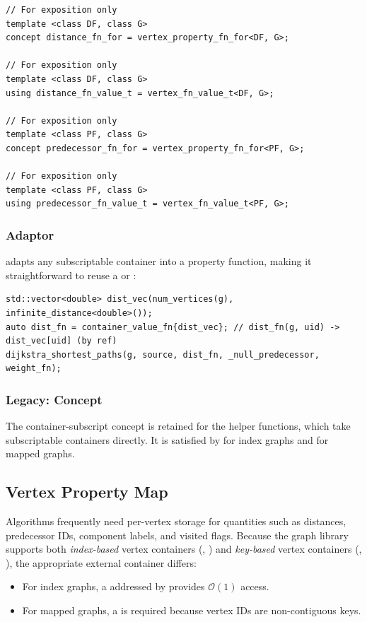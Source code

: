 \begin{lstlisting}
// For exposition only
template <class DF, class G>
concept distance_fn_for = vertex_property_fn_for<DF, G>;

// For exposition only
template <class DF, class G>
using distance_fn_value_t = vertex_fn_value_t<DF, G>;

// For exposition only
template <class PF, class G>
concept predecessor_fn_for = vertex_property_fn_for<PF, G>;

// For exposition only
template <class PF, class G>
using predecessor_fn_value_t = vertex_fn_value_t<PF, G>;
\end{lstlisting}

\subsubsection{ Adaptor}
 adapts any subscriptable container into a property
function, making it straightforward to reuse a  or
:
\begin{lstlisting}[texcl=false]
std::vector<double> dist_vec(num_vertices(g), infinite_distance<double>());
auto dist_fn = container_value_fn{dist_vec}; // dist_fn(g, uid) -> dist_vec[uid] (by ref)
dijkstra_shortest_paths(g, source, dist_fn, _null_predecessor, weight_fn);
\end{lstlisting}

\subsubsection{Legacy:  Concept}
The container-subscript concept  is retained for
the  helper functions, which take
subscriptable containers directly.  It is satisfied by  for index graphs
and  for mapped graphs.

\subsection{Vertex Property Map}
Algorithms frequently need per-vertex storage for quantities such as distances, predecessor
IDs, component labels, and visited flags.  Because the graph library supports both
\emph{index-based} vertex containers (, ) and
\emph{key-based} vertex containers (, ), the
appropriate external container differs:
\begin{itemize}
      \item For index graphs, a  addressed by  provides $\mathcal{O}(1)$ access.
      \item For mapped graphs, a  is required
            because vertex IDs are non-contiguous keys.
\end{itemize}

